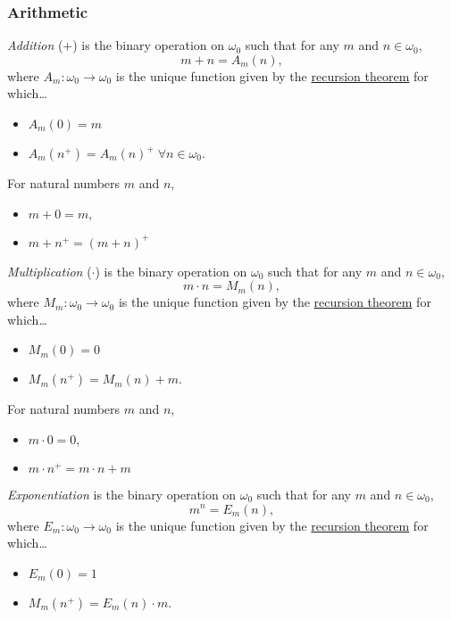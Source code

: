 \subsubsection{Arithmetic}\label{arithmetic}

\label{addition}
\emph{Addition} (+) is the binary operation on $\omega_0$ such that for any $m$ and $n \in \omega_0$,
$$m + n = A_m(n),$$
where $A_m: \omega_0 \rightarrow \omega_0$ is the unique function given by the \hyperref[recursion]{recursion theorem} for which\dots
\begin{itemize}
  \item $A_m(0) = m$
  \item $A_m(n^+) = A_m(n)^+ \; \forall n \in \omega_0.$
\end{itemize}

\begin{proposition}
For natural numbers $m$ and $n$,
\begin{itemize}
  \item $m + 0 = m,$
  \item $m + n^+ = (m+n)^+$
\end{itemize}
\end{proposition}

\label{multiplication}
\emph{Multiplication} ($\cdot$) is the binary operation on $\omega_0$ such that for any $m$ and $n \in \omega_0$,
$$m \cdot n = M_m(n),$$
where $M_m: \omega_0 \rightarrow \omega_0$ is the unique function given by the \hyperref[recursion]{recursion theorem} for which\dots
\begin{itemize}
  \item $M_m(0) = 0$
  \item $M_m(n^+) = M_m(n) + m.$
\end{itemize}

\begin{proposition}
For natural numbers $m$ and $n$,
\begin{itemize}
  \item $m \cdot 0 = 0,$
  \item $m \cdot n^+ = m \cdot n + m$
\end{itemize}
\end{proposition}

\label{exponentiation}
\emph{Exponentiation} is the binary operation on $\omega_0$ such that for any $m$ and $n \in \omega_0$,
$$m^n = E_m(n),$$
where $E_m: \omega_0 \rightarrow \omega_0$ is the unique function given by the \hyperref[recursion]{recursion theorem} for which\dots
\begin{itemize}
  \item $E_m(0) = 1$
  \item $M_m(n^+) = E_m(n) \cdot m.$
\end{itemize}

